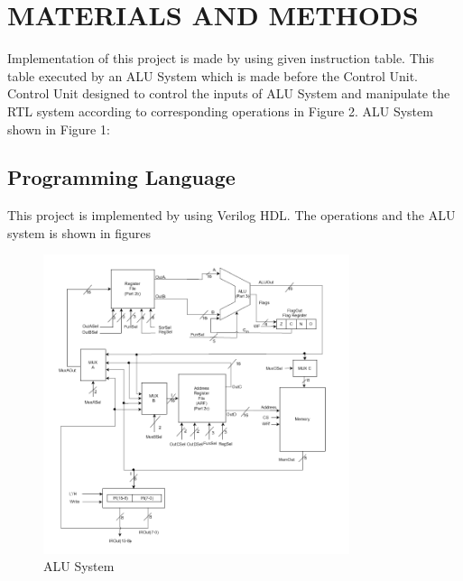 \documentclass[pdftex,12pt,a4paper]{article}
\begin{document}
	\section{MATERIALS AND METHODS}
	Implementation of this project is made by using given instruction table. This table executed by an ALU System which is made before the Control Unit. Control Unit designed to control the inputs of ALU System and manipulate the RTL system according to corresponding operations in Figure 2.
	ALU System shown in Figure 1:
	
	\subsection{Programming Language}
	This project is implemented by using Verilog HDL. The operations and the ALU system is shown in figures 
	\begin{figure}[H]
		\centering
		\includegraphics[width=0.8\textwidth]{ALUSystem.png}
		\caption{ALU System}
		\label{fig:ALU System}
	\end{figure}
\end{document}

